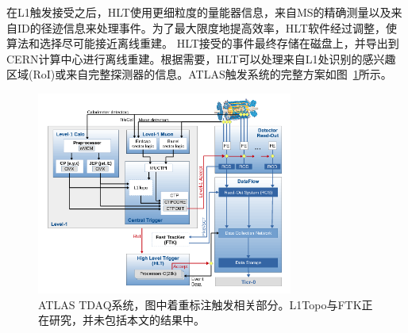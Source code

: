 在L1触发接受之后，HLT使用更细粒度的量能器信息，来自MS的精确测量以及来自ID的径迹信息来处理事件。为了最大限度地提高效率，HLT软件经过调整，使算法和选择尽可能接近离线重建。
HLT接受的事件最终存储在磁盘上，并导出到CERN计算中心进行离线重建。根据需要，HLT可以处理来自L1处识别的感兴趣区域(RoI)或来自完整探测器的信息。ATLAS触发系统的完整方案如图~\ref{fig:ATLAS_TDAQ}所示。
\begin{figure}[h]
\begin{center}
\includegraphics[width=0.75\textwidth]{fig/content_tdaq_figures_tdaq-run2-schematic.png}
\caption{ATLAS TDAQ系统\cite{Aaboud2017}，图中着重标注触发相关部分。L1Topo与FTK正在研究，并未包括本文的结果中。} \label{fig:ATLAS_TDAQ}
\end{center}
\end{figure}


